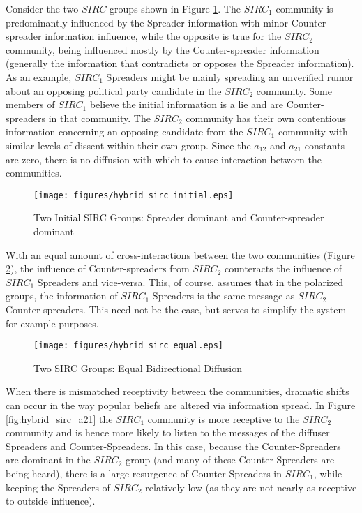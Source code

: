 Consider the two $SIRC$ groups shown in Figure \ref{fig:hybrid_sirc_initial}. The $SIRC_1$ community is predominantly influenced by the Spreader information with minor Counter-spreader information influence, while the opposite is true for the $SIRC_2$ community, being influenced mostly by the Counter-spreader information (generally the information that contradicts or opposes the Spreader information). As an example, $SIRC_1$ Spreaders might be mainly spreading an unverified rumor about an opposing political party candidate in the $SIRC_2$ community. Some members of $SIRC_1$ believe the initial information is a lie and are Counter-spreaders in that community. The $SIRC_2$ community has their own contentious information concerning an opposing candidate from the $SIRC_1$ community with similar levels of dissent within their own group. Since the  $a_{12}$ and $a_{21}$ constants are zero, there is no diffusion with which to cause interaction between the communities. 

\begin{figure}[!htbp] \centering
  \texttt{[image: figures/hybrid\_sirc\_initial.eps]}
  \caption{Two Initial SIRC Groups: Spreader dominant and Counter-spreader dominant}
  \label{fig:hybrid_sirc_initial}
\end{figure}

With an equal amount of cross-interactions between the two communities (Figure \ref{fig:hybrid_sirc_equal}), the influence of Counter-spreaders from $SIRC_2$ counteracts the influence of $SIRC_1$ Spreaders and vice-versa. This, of course, assumes that in the polarized groups, the information of $SIRC_1$ Spreaders is the same message as $SIRC_2$ Counter-spreaders. This need not be the case, but serves to simplify the system for example purposes. 

\begin{figure}[!htbp] \centering
  \texttt{[image: figures/hybrid\_sirc\_equal.eps]}
  \caption{Two SIRC Groups: Equal Bidirectional Diffusion}
  \label{fig:hybrid_sirc_equal}
\end{figure}

When there is mismatched receptivity between the communities, dramatic shifts can occur in the way popular beliefs are altered via information spread. In Figure \ref{fig:hybrid_sirc_a21} the $SIRC_1$ community is more receptive to the $SIRC_2$ community and is hence more likely to listen to the messages of the diffuser Spreaders and Counter-Spreaders. In this case, because the Counter-Spreaders are dominant in the $SIRC_2$ group (and many of these Counter-Spreaders are being heard), there is a large resurgence of Counter-Spreaders in $SIRC_1$, while keeping the Spreaders of $SIRC_2$ relatively low (as they are not nearly as receptive to outside influence). 

